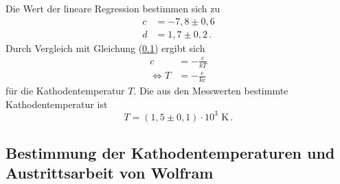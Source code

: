 Die Wert der lineare Regression bestimmen sich zu 
\begin{align*}
    c &= -7,8 \pm 0,6 \\
    d &= 1,7 \pm 0,2 \, .
\end{align*}
Durch Vergleich mit Gleichung (\ref{}) ergibt sich 
\begin{align*}
    c &= -\frac{e}{kT} \\
    \Leftrightarrow T &= -\frac{e}{kc}
\end{align*}
für die Kathodentemperatur $T$. 
Die aus den Messwerten bestimmte Kathodentemperatur ist 
$$ T = (1,5 \pm 0,1)\cdot 10^{3} \, \, \unit{\kelvin}\,.$$

\subsection{Bestimmung der Kathodentemperaturen und Austrittsarbeit von Wolfram}

